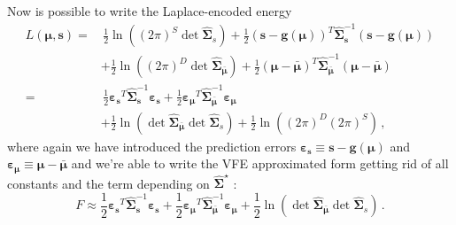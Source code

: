 \documentclass[a4paper, 10pt]{article}
\begin{document}
Now is possible to write the Laplace-encoded energy
\begin{equation}
\begin{split}
L(\bm \mu, \mathbf s) = & \, \frac{1}{2} \ln \left( (2 \pi)^S \det \bm{\hat{\Sigma}}_{s} \right) + \frac{1}{2} \left(\mathbf s - \bm g(\bm \mu) \right)^T \bm{\hat{\Sigma}}_{\mathbf s}^{-1} \left(\mathbf s - \bm g(\bm \mu) \right) \\
			& + \frac{1}{2} \ln \left( (2 \pi)^D \det \bm{\hat{\Sigma}}_{\bar{\bm \mu}} \right) + \frac{1}{2} (\bm \mu - \bm \bar{\bm \mu})^T \bm{\hat{\Sigma}}_{\bar{\bm \mu}}^{-1} (\bm \mu - \bm \bar{\bm \mu}) \\
		=	& \, \frac{1}{2} \bm{\varepsilon_{\mathbf s}}^T \bm{\hat{\Sigma}}_{\mathbf s}^{-1} \bm{\varepsilon_{\mathbf s}} + \frac{1}{2} \bm{\varepsilon_{\bm \mu}}^T \bm{\hat{\Sigma}}_{\bar{\bm \mu}}^{-1} \bm{\varepsilon_{\bm \mu}} \\
			& + \frac{1}{2} \ln \left( \det \bm{\hat{\Sigma}}_{\bar{\bm \mu}} \det \bm{\hat{\Sigma}}_{s} \right) + \frac{1}{2} \ln \left( (2 \pi)^D (2 \pi)^S  \right) \, ,
\end{split}
\end{equation}
where again we have introduced the prediction errors $\bm{\varepsilon_{\mathbf s}} \equiv \mathbf s - \bm g(\bm \mu)$ and $\bm{\varepsilon_{\bm \mu}} \equiv \bm \mu - \bm \bar{\bm \mu}$ and we're able to write the VFE approximated form getting rid of all constants and the term depending on $\bm{\hat{\Sigma}}^{\star}$ :
\begin{equation}
F \approx \frac{1}{2} \bm{\varepsilon_{\mathbf s}}^T \bm{\hat{\Sigma}}_{\mathbf s}^{-1} \bm{\varepsilon_{\mathbf s}} + \frac{1}{2} \bm{\varepsilon_{\bm \mu}}^T \bm{\hat{\Sigma}}_{\bar{\bm \mu}}^{-1} \bm{\varepsilon_{\bm \mu}} + \frac{1}{2} \ln \left( \det \bm{\hat{\Sigma}}_{\bar{\bm \mu}} \det \bm{\hat{\Sigma}}_{s} \right) \, .
\end{equation}
\end{document}
